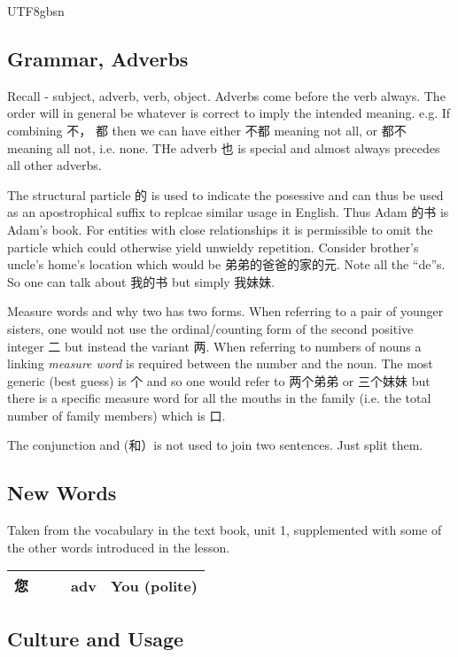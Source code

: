\documentclass{article}
\newcommand{\myfont}{gbsn} %
\newcommand{\cvctp}[4]{#1 & \xpinyin*{#1} & \pinyin{#2} & #3 & #4 \\ \hline}
\begin{document}
\begin{CJK}{UTF8}{\myfont}
      
      \subsection{Grammar, Adverbs}

      Recall - subject, adverb, verb, object.  Adverbs come before the verb always.   The order will in general be whatever is correct to imply the intended meaning.  e.g. If combining 不， 都 then we can have either 不都 meaning not all, or 都不 meaning all not, i.e. none.   THe adverb 也 is special and almost always precedes all other adverbs.

      The structural particle 的 is used to indicate the posessive and can thus be used as an apostrophical suffix to replcae similar usage in English.   Thus Adam 的书 is Adam's book.  For entities with close relationships it is permissible to omit the particle which could otherwise yield unwieldy repetition.   Consider brother's uncle's home's location which would be 弟弟的爸爸的家的元.  Note all the ``de''s.   So one can talk about 我的书 but simply 我妹妹.

      Measure words and why two has two forms.   When referring to a pair of younger sisters, one would not use the ordinal/counting form of the second positive integer 二 but instead the variant 两.   When referring to numbers of nouns a linking {\it measure word} is required between the number and the noun.  The most generic (best guess) is 个 and so one would refer to 两个弟弟 or 三个妹妹 but there is a specific measure word for all the mouths in the family (i.e. the total number of family members) which is 口.

      The conjunction and (和）is not used to join two sentences.   Just split them.


\subsection{New Words}

Taken from the vocabulary in the text book, unit 1, supplemented with some of the other words introduced in the lesson.

    \begin{tabular}{|l|l|l|l|l|} \hline
      \cvctp{您}{nin}{adv}{You (polite)} 
    \end{tabular}

    \subsection{Culture and Usage}

\end{CJK}
\end{document}
